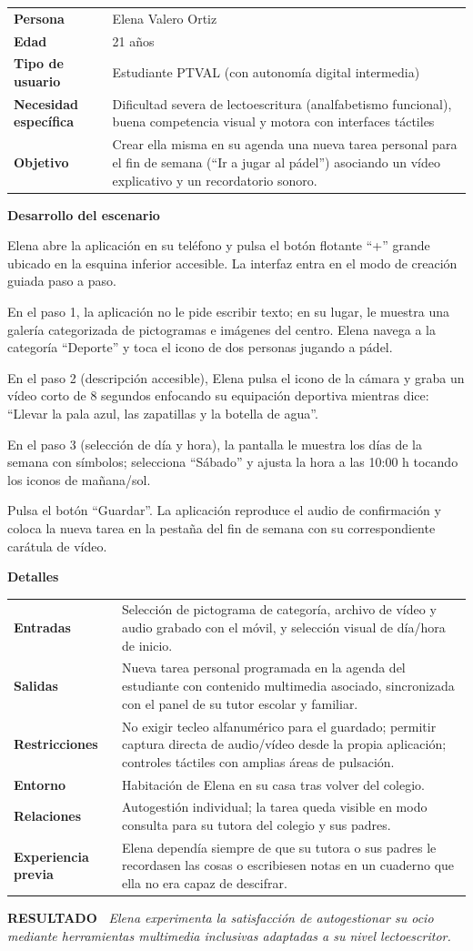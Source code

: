 \documentclass[11pt,a4paper]{article}
\makeatletter
\newcommand{\escenariocard}[6]{%
\needspace{10\baselineskip}
\begin{tcolorbox}[breakable,enhanced,colback=white,colframe=brandgreen,boxrule=0.8pt,arc=3pt,
  left=9pt,right=9pt,top=7pt,bottom=7pt,before skip=10pt,after skip=10pt,
  title={\textbf{\color{white}ESCENARIO #1} \\[1pt] {\small\color{tintgreen}#2}},
  colbacktitle=brandgreen,coltitle=white,fonttitle=\bfseries,boxed title style={colframe=brandgreen}]
{\setlength{\parskip}{0pt}\renewcommand{\arraystretch}{1.35}\rowcolors{1}{tintgreen}{white}\arrayrulecolor{white}
\begin{tabular}{@{\hspace{4pt}}>{\bfseries\color{brandgreen}}p{3.4cm}p{11.4cm}@{}}
#3 \\
\end{tabular}}
\vspace{6pt}
\textbf{\color{brandblue}Desarrollo del escenario}\par\vspace{2pt}
#4
\par\vspace{4pt}
\textbf{\color{brandblue}Detalles}\par\vspace{2pt}
{\setlength{\parskip}{0pt}\renewcommand{\arraystretch}{1.35}\rowcolors{1}{tintblue}{white}\arrayrulecolor{white}
\begin{tabular}{@{\hspace{4pt}}>{\bfseries\color{brandblue}}p{3.4cm}p{11.4cm}@{}}
#5 \\
\end{tabular}}
\vspace{6pt}
\begin{tcolorbox}[colback=tintblue,colframe=brandblue,boxrule=0pt,sharp corners,borderline west={3pt}{0pt}{brandblue},left=8pt,right=8pt,top=5pt,bottom=5pt]
\textbf{\small\color{brandblue}RESULTADO\ } {\small\itshape #6}
\end{tcolorbox}
\end{tcolorbox}
}
\makeatother
\begin{document}
\escenariocard{6}{Creación de una tarea personal de ocio con soporte en vídeo y audio}{%
Persona & Elena Valero Ortiz \\
Edad & 21 años \\
Tipo de usuario & Estudiante PTVAL (con autonomía digital intermedia) \\
Necesidad específica & Dificultad severa de lectoescritura (analfabetismo funcional), buena competencia visual y motora con interfaces táctiles \\
Objetivo & Crear ella misma en su agenda una nueva tarea personal para el fin de semana (``Ir a jugar al pádel'') asociando un vídeo explicativo y un recordatorio sonoro.
}{%
Elena abre la aplicación en su teléfono y pulsa el botón flotante ``+'' grande ubicado en la esquina inferior accesible. La interfaz entra en el modo de creación guiada paso a paso.

En el paso 1, la aplicación no le pide escribir texto; en su lugar, le muestra una galería categorizada de pictogramas e imágenes del centro. Elena navega a la categoría ``Deporte'' y toca el icono de dos personas jugando a pádel.

En el paso 2 (descripción accesible), Elena pulsa el icono de la cámara y graba un vídeo corto de 8 segundos enfocando su equipación deportiva mientras dice: ``Llevar la pala azul, las zapatillas y la botella de agua''.

En el paso 3 (selección de día y hora), la pantalla le muestra los días de la semana con símbolos; selecciona ``Sábado'' y ajusta la hora a las 10:00 h tocando los iconos de mañana/sol.

Pulsa el botón ``Guardar''. La aplicación reproduce el audio de confirmación y coloca la nueva tarea en la pestaña del fin de semana con su correspondiente carátula de vídeo.
}{%
Entradas & Selección de pictograma de categoría, archivo de vídeo y audio grabado con el móvil, y selección visual de día/hora de inicio. \\
Salidas & Nueva tarea personal programada en la agenda del estudiante con contenido multimedia asociado, sincronizada con el panel de su tutor escolar y familiar. \\
Restricciones & No exigir tecleo alfanumérico para el guardado; permitir captura directa de audio/vídeo desde la propia aplicación; controles táctiles con amplias áreas de pulsación. \\
Entorno & Habitación de Elena en su casa tras volver del colegio. \\
Relaciones & Autogestión individual; la tarea queda visible en modo consulta para su tutora del colegio y sus padres. \\
Experiencia previa & Elena dependía siempre de que su tutora o sus padres le recordasen las cosas o escribiesen notas en un cuaderno que ella no era capaz de descifrar.
}{Elena experimenta la satisfacción de autogestionar su ocio mediante herramientas multimedia inclusivas adaptadas a su nivel lectoescritor.}
\end{document}
